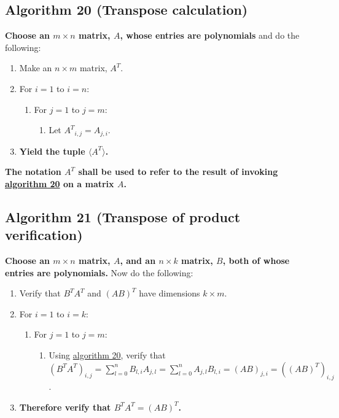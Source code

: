\documentclass[twocolumn]{article}
\begin{document}
		\subsection{Algorithm 20 (Transpose calculation)}\label{sec:algorithm 20}
			\textbf{Choose an $m\times n$ matrix, $A$, whose entries are polynomials} and do the following:
			\begin{enumerate}
				\item Make an $n\times m$ matrix, $A^T$.
				\item For $i=1$ to $i=n$:
				\begin{enumerate}
					\item For $j=1$ to $j=m$:
					\begin{enumerate}
						\item Let ${A^T}_{i,j}=A_{j,i}$.
					\end{enumerate}
				\end{enumerate}
				\item \textbf{Yield the tuple $\langle A^T\rangle$.}
			\end{enumerate}
			\textbf{The notation $A^T$ shall be used to refer to the result of invoking \hyperref[sec:algorithm 20]{algorithm 20} on a matrix $A$.}
		\subsection{Algorithm 21 (Transpose of product verification)}\label{sec:algorithm 21}
			\textbf{Choose an $m\times n$ matrix, $A$, and an $n\times k$ matrix, $B$, both of whose entries are polynomials.} Now do the following:
			\begin{enumerate}
				\item Verify that $B^TA^T$ and $(AB)^T$ have dimensions $k\times m$.
				\item For $i=1$ to $i=k$:
				\begin{enumerate}
					\item For $j=1$ to $j=m$:
					\begin{enumerate}
						\item Using \hyperref[sec:algorithm 20]{algorithm 20}, verify that $(B^TA^T)_{i,j}=\sum_{l=0}^n B_{l,i}A_{j,l}=\sum_{l=0}^n A_{j,l}B_{l,i}=(AB)_{j,i}=((AB)^T)_{i,j}$.
					\end{enumerate}
				\end{enumerate}
				\item \textbf{Therefore verify that $B^TA^T=(AB)^T$.}
			\end{enumerate}
\end{document}
